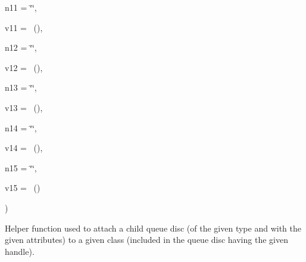{\begin{DoxyParamCaption}
\item[{std\+::string}]{n11 = {\ttfamily \char`\"{}\char`\"{}}, }
\item[{const {\bf Attribute\+Value} \&}]{v11 = {~()}, }
\item[{std\+::string}]{n12 = {\ttfamily \char`\"{}\char`\"{}}, }
\item[{const {\bf Attribute\+Value} \&}]{v12 = {~()}, }
\item[{std\+::string}]{n13 = {\ttfamily \char`\"{}\char`\"{}}, }
\item[{const {\bf Attribute\+Value} \&}]{v13 = {~()}, }
\item[{std\+::string}]{n14 = {\ttfamily \char`\"{}\char`\"{}}, }
\item[{const {\bf Attribute\+Value} \&}]{v14 = {~()}, }
\item[{std\+::string}]{n15 = {\ttfamily \char`\"{}\char`\"{}}, }
\item[{const {\bf Attribute\+Value} \&}]{v15 = {~()}}
\end{DoxyParamCaption}
)}\hypertarget{classns3_1_1TrafficControlHelper_a2a128a73e2ba7d1a9a1b316d6db772ab}{}\label{classns3_1_1TrafficControlHelper_a2a128a73e2ba7d1a9a1b316d6db772ab}
Helper function used to attach a child queue disc (of the given type and with the given attributes) to a given class (included in the queue disc having the given handle).


